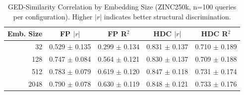 
\begin{table}[htbp]
\centering
\caption{GED-Similarity Correlation by Embedding Size (ZINC250k, n=100 queries per configuration). Higher $|r|$ indicates better structural discrimination.}
\label{tab:ged_correlation}
\begin{tabular}{rcccc}
\toprule
\textbf{Emb. Size} & \textbf{FP $|r|$} & \textbf{FP R$^2$} & \textbf{HDC $|r|$} & \textbf{HDC R$^2$} \\
\midrule
32 & 0.529 $\pm$ 0.135 & 0.299 $\pm$ 0.134 & 0.831 $\pm$ 0.137 & 0.710 $\pm$ 0.189 \\
128 & 0.747 $\pm$ 0.084 & 0.564 $\pm$ 0.121 & 0.830 $\pm$ 0.137 & 0.709 $\pm$ 0.188 \\
512 & 0.783 $\pm$ 0.079 & 0.619 $\pm$ 0.120 & 0.847 $\pm$ 0.118 & 0.731 $\pm$ 0.174 \\
2048 & 0.790 $\pm$ 0.078 & 0.630 $\pm$ 0.119 & 0.848 $\pm$ 0.121 & 0.733 $\pm$ 0.176 \\
\bottomrule
\end{tabular}
\end{table}
